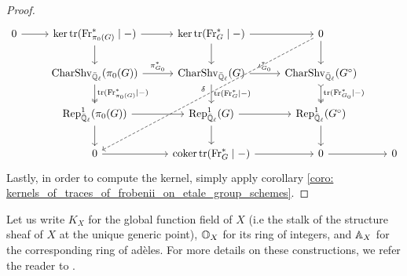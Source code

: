 \begin{proof}
                    $$
                        \begin{tikzcd}
                        	0 & {\ker \trace(\Frob^*_{\pi_0(G)} \mid -)} & {\ker \trace(\Frob^*_G \mid -)} & 0 \\
                        	& {\Char\Shv_{\bar{\Q}_{\ell}}(\pi_0(G))} & {\Char\Shv_{\bar{\Q}_{\ell}}(G)} & {\Char\Shv_{\bar{\Q}_{\ell}}(G^{\circ})} \\
                        	& {\Rep^1_{\bar{\Q}_{\ell}}(\pi_0(G))} & {\Rep^1_{\bar{\Q}_{\ell}}(G)} & {\Rep^1_{\bar{\Q}_{\ell}}(G^{\circ})} \\
                        	& 0 & {\coker \trace(\Frob^*_G \mid -)} & 0 & 0
                        	\arrow["{\trace(\Frob^*_{\pi_0(G)} \mid -)}", two heads, from=2-2, to=3-2]
                        	\arrow["{\trace(\Frob^*_G \mid -)}", from=2-3, to=3-3]
                        	\arrow["{\trace(\Frob^*_{G_0} \mid -)}", tail, two heads, from=2-4, to=3-4]
                        	\arrow["{\pi_{G_0}^*}", from=2-2, to=2-3]
                        	\arrow["{\iota_{G_0}^*}", from=2-3, to=2-4]
                        	\arrow[from=3-2, to=3-3]
                        	\arrow[from=3-3, to=3-4]
                        	\arrow[from=1-1, to=1-2]
                        	\arrow[from=1-2, to=1-3]
                        	\arrow[from=1-3, to=1-4]
                        	\arrow["\delta"', dashed, from=1-4, to=4-2]
                        	\arrow[from=4-2, to=4-3]
                        	\arrow[from=4-3, to=4-4]
                        	\arrow[from=4-4, to=4-5]
                        	\arrow[from=1-4, to=2-4]
                        	\arrow[from=3-4, to=4-4]
                        	\arrow[from=3-2, to=4-2]
                        	\arrow[from=1-2, to=2-2]
                        	\arrow[from=1-3, to=2-3]
                        	\arrow[from=3-3, to=4-3]
                        \end{tikzcd}
                    $$
                Lastly, in order to compute the kernel, simply apply corollary \ref{coro: kernels_of_traces_of_frobenii_on_etale_group_schemes}.
            \end{proof}
            
        \begin{convention} \label{conv: global_function_field}
            Let us write $K_X$ for the global function field of $X$ (i.e the stalk of the structure sheaf of $X$ at the unique generic point), $\mathbb{O}_X$ for its ring of integers, and $\mathbb{A}_X$ for the corresponding ring of ad\`eles. For more details on these constructions, we refer the reader to \cite[Section VI.1]{neukirch_2010_algebraic_number_theory}. 
        \end{convention}
        
